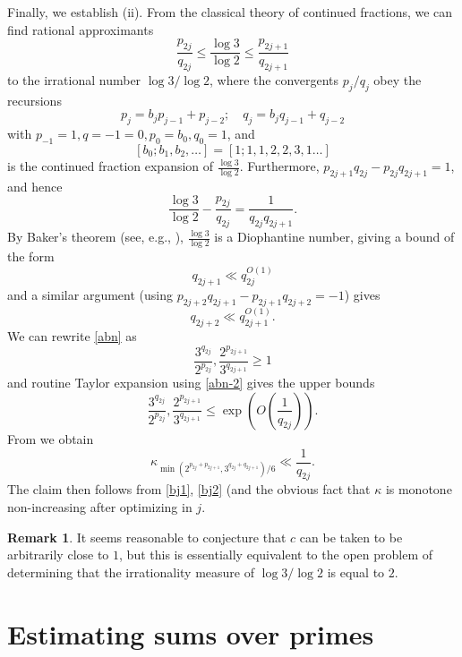 \documentclass[12pt,a4paper,reqno]{amsart}
\numberwithin{equation}{section}
\theoremstyle{plain}
\theoremstyle{definition}
\newtheorem{remark}[theorem]{Remark}
\begin{document}
Finally, we establish (ii).  From the classical theory of continued fractions, we can find rational approximants
\begin{equation}\label{abn}
 \frac{p_{2j}}{q_{2j}} \leq \frac{\log 3}{\log 2} \leq \frac{p_{2j+1}}{q_{2j+1}}
\end{equation}
to the irrational number $\log 3/\log 2$, where the convergents $p_j/q_j$ obey the recursions
$$ p_j = b_j p_{j-1} + p_{j-2}; \quad q_j = b_j q_{j-1} + q_{j-2}$$
with $p_{-1} = 1, q={-1}=0, p_0 = b_0, q_0=1$, and 
$$[b_0;b_1,b_2,\dots] = [1;1,1,2,2,3,1\dots]$$ 
is the continued fraction expansion of $\frac{\log 3}{\log 2}$.  Furthermore, $p_{2j+1}q_{2j} - p_{2j} q_{2j+1} = 1$, and hence
\begin{equation}\label{abn-2} 
  \frac{\log 3}{\log 2} - \frac{p_{2j}}{q_{2j}} = \frac{1}{q_{2j} q_{2j+1}}.
\end{equation}
By Baker's theorem (see, e.g., \cite{baker-wustholz}), $\frac{\log 3}{\log 2}$ is a Diophantine number, giving a bound of the form
\begin{equation}\label{bj1}
   q_{2j+1} \ll q_{2j}^{O(1)}
\end{equation}
and a similar argument (using $p_{2j+2} q_{2j+1}-p_{2j+1} q_{2j+2} = -1$) gives
\begin{equation}\label{bj2}
 q_{2j+2} \ll q_{2j+1}^{O(1)}.
\end{equation}
We can rewrite \eqref{abn} as
$$ \frac{3^{q_{2j}}}{2^{p_{2j}}}, \frac{2^{p_{2j+1}}}{3^{q_{2j+1}}}\geq 1$$
and routine Taylor expansion using \eqref{abn-2} gives the upper bounds
$$ \frac{3^{q_{2j}}}{2^{p_{2j}}}, \frac{2^{p_{2j+1}}}{3^{q_{2j+1}}}\leq \exp\left( O\left( \frac{1}{q_{2j}}\right)\right).$$
From  we obtain
$$
\kappa_{\min(2^{p_{2j} + p_{2j+1}}, 3^{q_{2j}+q_{2j+1}})/6} \ll \frac{1}{q_{2j}}.$$
The claim then follows from \eqref{bj1}, \eqref{bj2} (and the obvious fact that $\kappa$ is monotone non-increasing after optimizing in $j$.

\begin{remark}
It seems reasonable to conjecture that $c$ can be taken to be arbitrarily close to $1$, but this is essentially equivalent to the open problem of determining that the irrationality measure of $\log 3 / \log 2$ is equal to $2$.
\end{remark}



\section{Estimating sums over primes}\label{primes-sec}
\end{document}
